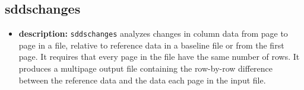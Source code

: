 \newpage
\subsection{sddschanges}
\label{sddschanges}

\begin{itemize}
\item {\bf description:} {\tt sddschanges} analyzes changes in column data from page to page in a file,
relative to reference data in a baseline file or from the first page.  It requires that every page in the file have
the same number of rows.  It produces a multipage output file containing the row-by-row difference between the
reference data and the data each page in the input file.


\end{itemize}
